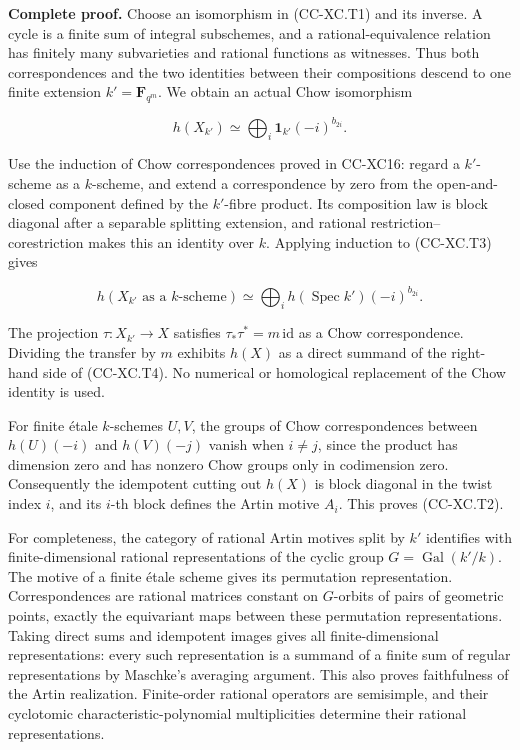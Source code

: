 \textbf{Complete proof.} Choose an isomorphism in (CC-XC.T1) and its
inverse. A cycle is a finite sum of integral subschemes, and a
rational-equivalence relation has finitely many subvarieties and
rational functions as witnesses. Thus both correspondences and the two
identities between their compositions descend to one finite extension
\(k'=\mathbf F_{q^m}\). We obtain an actual Chow isomorphism

\[
                     h(X_{k'})\simeq
                         \bigoplus_i\mathbf1_{k'}(-i)^{b_{2i}}.
\tag{CC-XC.T3}
\]

Use the induction of Chow correspondences proved in CC-XC16: regard a
\(k'\)-scheme as a \(k\)-scheme, and extend a correspondence by zero
from the open-and-closed component defined by the \(k'\)-fibre product.
Its composition law is block diagonal after a separable splitting
extension, and rational restriction--corestriction makes this an
identity over \(k\). Applying induction to (CC-XC.T3) gives

\[
 h(X_{k'}\text{ as a }k\text{-scheme})
      \simeq\bigoplus_i h(\operatorname{Spec}k')(-i)^{b_{2i}}.
\tag{CC-XC.T4}
\]

The projection \(\tau:X_{k'}\to X\) satisfies
\(\tau_*\tau^*=m\,\mathrm{id}\) as a Chow correspondence. Dividing the
transfer by \(m\) exhibits \(h(X)\) as a direct summand of the
right-hand side of (CC-XC.T4). No numerical or homological replacement
of the Chow identity is used.

For finite étale \(k\)-schemes \(U,V\), the groups of Chow
correspondences between \(h(U)(-i)\) and \(h(V)(-j)\) vanish when
\(i\ne j\), since the product has dimension zero and has nonzero Chow
groups only in codimension zero. Consequently the idempotent cutting out
\(h(X)\) is block diagonal in the twist index \(i\), and its \(i\)-th
block defines the Artin motive \(A_i\). This proves (CC-XC.T2).

For completeness, the category of rational Artin motives split by \(k'\)
identifies with finite-dimensional rational representations of the
cyclic group \(G=\operatorname{Gal}(k'/k)\). The motive of a finite
étale scheme gives its permutation representation. Correspondences are
rational matrices constant on \(G\)-orbits of pairs of geometric points,
exactly the equivariant maps between these permutation representations.
Taking direct sums and idempotent images gives all finite-dimensional
representations: every such representation is a summand of a finite sum
of regular representations by Maschke's averaging argument. This also
proves faithfulness of the Artin realization. Finite-order rational
operators are semisimple, and their cyclotomic characteristic-polynomial
multiplicities determine their rational representations.

